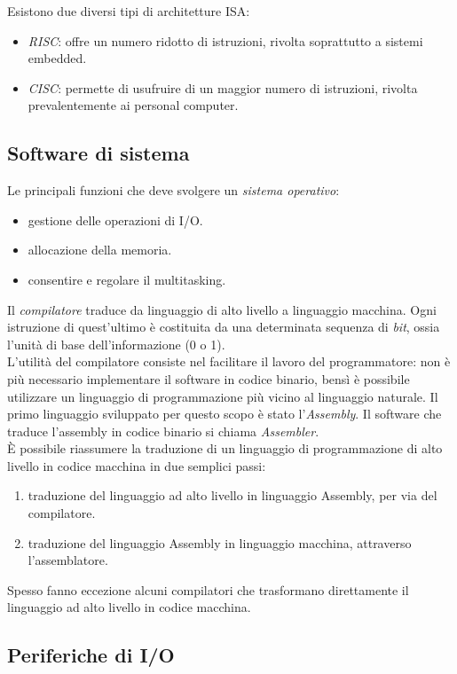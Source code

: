 \documentclass[class=book, crop=false]{standalone}
\begin{document}
Esistono due diversi tipi di architetture ISA:
\begin{itemize}[noitemsep]
	\item \emph{RISC}: offre un numero ridotto di istruzioni, rivolta soprattutto a sistemi embedded.
	\item \emph{CISC}: permette di usufruire di un maggior numero di istruzioni, rivolta prevalentemente ai personal computer.
\end{itemize}

\subsection{Software di sistema}
Le principali funzioni che deve svolgere un \emph{sistema operativo}:
\begin{itemize}[noitemsep]
  \item gestione delle operazioni di I/O.
  \item allocazione della memoria.
  \item consentire e regolare il multitasking.
\end{itemize}
Il \emph{compilatore} traduce da linguaggio di alto livello a linguaggio macchina. Ogni istruzione di quest'ultimo è costituita da una determinata sequenza di \emph{bit}, ossia l'unità di base dell'informazione (0 o 1).\\
L'utilità del compilatore consiste nel facilitare il lavoro del programmatore: non è più necessario implementare il software in codice binario, bensì è possibile utilizzare un linguaggio di programmazione più vicino al linguaggio naturale. Il primo linguaggio sviluppato per questo scopo è stato l'\emph{Assembly}. Il software che traduce l'assembly in codice binario si chiama \emph{Assembler}.\\
\`{E} possibile riassumere la traduzione di un linguaggio di programmazione di alto livello in codice macchina in due semplici passi:
\begin{enumerate}[noitemsep]
  \item traduzione del linguaggio ad alto livello in linguaggio Assembly, per via del compilatore.
  \item traduzione del linguaggio Assembly in linguaggio macchina, attraverso l'assemblatore.
\end{enumerate}
Spesso fanno eccezione alcuni compilatori che trasformano direttamente il linguaggio ad alto livello in codice macchina.

\subsection{Periferiche di I/O}
\end{document}

